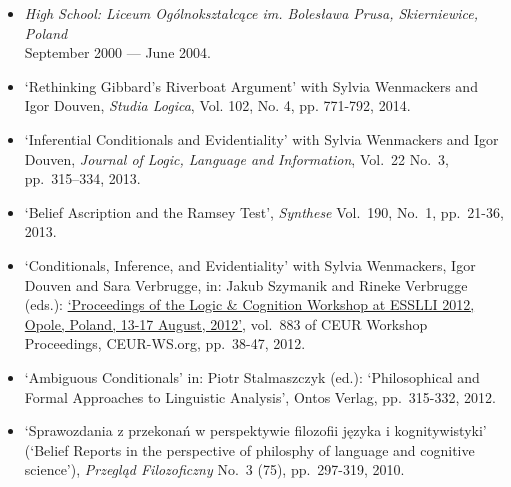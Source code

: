 \documentclass[a4paper,12pt]{article}
\begin{document}
\begin{small}
\begin{itemize}
    \item \emph{High School: Liceum Ogólnokształcące im. Bolesława Prusa, Skierniewice, Poland}\\
    September 2000 --- June 2004.

  \end{itemize}


  \begin{itemize}
    \item `Rethinking Gibbard's Riverboat Argument' with Sylvia Wenmackers and Igor Douven, \emph{Studia Logica}, Vol. 102, No. 4, pp. 771-792, 2014.

    \item `Inferential Conditionals and Evidentiality' with Sylvia Wenmackers and Igor Douven, \emph{Journal of Logic, Language and Information}, Vol.~22 No.~3, pp.~315–334, 2013.

    \item `Belief Ascription and the Ramsey Test', \emph{Synthese} Vol.~190, No.~1, pp.~21-36, 2013. %

    \item `Conditionals, Inference, and Evidentiality' with Sylvia Wenmackers, Igor Douven and Sara Verbrugge, in: Jakub Szymanik and Rineke Verbrugge (eds.): \href{http://ceur-ws.org/Vol-883/}{`Proceedings of the Logic \& Cognition Workshop at ESSLLI 2012, Opole, Poland, 13-17 August, 2012'}, vol.~883 of CEUR Workshop Proceedings, CEUR-WS.org, pp.~38-47, 2012.

    \item `Ambiguous Conditionals' in: Piotr Stalmaszczyk (ed.): `Philosophical and Formal Approaches to Linguistic Analysis', Ontos Verlag, pp.~315-332, 2012.

    \item `Sprawozdania z przekonań w perspektywie filozofii języka i kognitywistyki' (`Belief Reports in the perspective of philosphy of language and cognitive science'), \emph{Przegląd Filozoficzny} No.~3 (75), pp.~297-319, 2010.

  \end{itemize}


\end{small}
\end{document}
